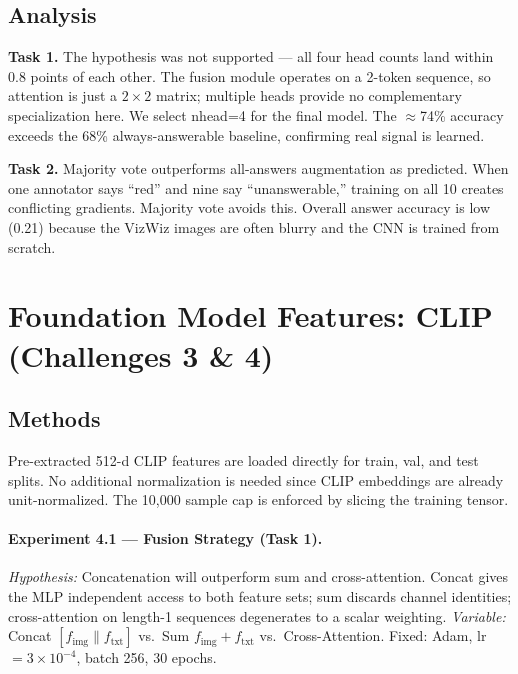 \documentclass[11pt]{article}
\begin{document}
\subsection{Analysis}

\textbf{Task 1.} The hypothesis was not supported — all four head counts land within 0.8
points of each other. The fusion module operates on a 2-token sequence, so attention is
just a $2\times2$ matrix; multiple heads provide no complementary specialization here. We
select nhead=4 for the final model. The $\approx$74\% accuracy exceeds the 68\%
always-answerable baseline, confirming real signal is learned.

\textbf{Task 2.} Majority vote outperforms all-answers augmentation as predicted. When
one annotator says ``red'' and nine say ``unanswerable,'' training on all 10 creates
conflicting gradients. Majority vote avoids this. Overall answer accuracy is low (0.21)
because the VizWiz images are often blurry and the CNN is trained from scratch.

\section{Foundation Model Features: CLIP (Challenges 3 \& 4)}

\subsection{Methods}

Pre-extracted 512-d CLIP features are loaded directly for train, val, and test splits.
No additional normalization is needed since CLIP embeddings are already unit-normalized.
The 10{,}000 sample cap is enforced by slicing the training tensor.

\paragraph{Experiment 4.1 — Fusion Strategy (Task 1).}
\textit{Hypothesis:} Concatenation will outperform sum and cross-attention. Concat gives
the MLP independent access to both feature sets; sum discards channel identities;
cross-attention on length-1 sequences degenerates to a scalar weighting.
\textit{Variable:} Concat $[f_\text{img} \| f_\text{txt}]$ vs.\ Sum $f_\text{img}+f_\text{txt}$
vs.\ Cross-Attention. Fixed: Adam, lr $=3\times10^{-4}$, batch 256, 30 epochs.
\end{document}

